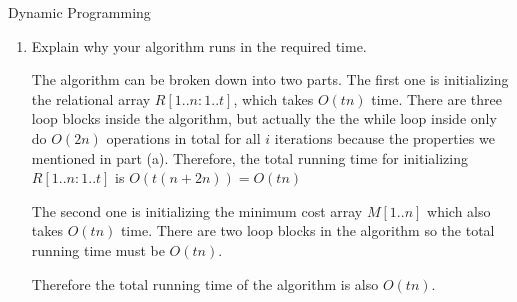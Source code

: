 \documentclass{article}
\numberwithin{table}{section}
\numberwithin{figure}{section}
\begin{document}
\begin{section}{Dynamic Programming}
\begin{enumerate}
    \newpage
    \item Explain why your algorithm runs in the required time.
    \begin{tcolorbox}
        The algorithm can be broken down into two parts. The first one is initializing the relational array $R[1..n : 1..t]$, which takes $O(tn)$ time. There are three loop blocks inside the algorithm, but actually the the while loop inside only do $O(2n)$ operations in total for all $i$ iterations because the properties we mentioned in part (a). Therefore, the total running time for initializing $R[1..n : 1..t]$ is $O(t(n + 2n)) = O(tn)$
        
        The second one is initializing the minimum cost array $M[1..n]$ which also takes $O(tn)$ time. There are two loop blocks in the algorithm so the total running time must be $O(tn)$. 
        
        Therefore the total running time of the algorithm is also $O(tn)$.
    \end{tcolorbox}
\end{enumerate}
\end{section}
\end{document}
